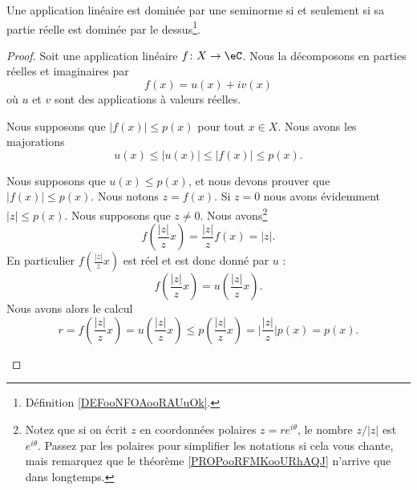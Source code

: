 \begin{lemma}		\label{LEMooKTSKooIteFGq}
	Une application linéaire est dominée par une seminorme si et seulement si sa partie réelle est dominée par le dessus\footnote{Définition \ref{DEFooNFOAooRAUuOk}.}.
\end{lemma}

\begin{proof}
	Soit une application linéaire \(f \colon X\to \eC  \). Nous la décomposons en parties réelles et imaginaires par
	\begin{equation}
		f(x)=u(x)+iv(x)
	\end{equation}
	où \( u\) et \( v\) sont des applications à valeurs réelles.

	\begin{subproof}
		\spitem[\( \Rightarrow\)]
		Nous supposons que \( | f(x) |\leq p(x)\) pour tout \( x\in X\). Nous avons les majorations
		\begin{equation}
			u(x)\leq | u(x) |\leq | f(x) |\leq p(x).
		\end{equation}

		\spitem[\( \Leftarrow\)]
		Nous supposons que \( u(x)\leq p(x)\), et nous devons prouver que \( | f(x) |\leq p(x)\). Nous notons \( z=f(x)\). Si \( z=0\) nous avons évidemment \( | z |\leq p(x)\). Nous supposons que \( z\neq 0\). Nous avons\footnote{Notez que si on écrit \( z\) en coordonnées polaires \( z=re^{i\theta}\), le nombre \( z/| z |\) est \( e^{i\theta}\). Passez par les polaires pour simplifier les notations si cela vous chante, mais remarquez que le théorème \ref{PROPooRFMKooURhAQJ} n'arrive que dans longtemps.}
		\begin{equation}
			f(\frac{ | z | }{ z }x)=\frac{ | z | }{ z }f(x)=| z |.
		\end{equation}
		En particulier \( f(\frac{ | z | }{ z }x)\) est réel et est donc donné par \( u\) :
		\begin{equation}
			f(\frac{ | z | }{ z }x)=u(\frac{ | z | }{ z }x).
		\end{equation}
		Nous avons alors le calcul
		\begin{equation}
			r=f(\frac{ | z | }{ z }x)=u(\frac{ | z | }{ z }x)\leq p(\frac{ | z | }{ z }x)=\big| \frac{ | z | }{ z }\big|p(x) =p(x).
		\end{equation}
	\end{subproof}
\end{proof}


